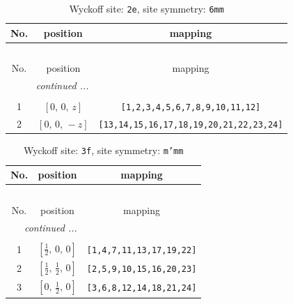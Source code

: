 \documentclass[fleqn,8pt]{jsarticle}
\begin{document}
\begin{longtable}{ccc}
\caption{Wyckoff site: {\tt 2e}, site symmetry: {\tt 6mm}}
 \\
 \hline \hline
No. & position & mapping \\ \hline \endfirsthead

\multicolumn{2}{l}{\tablename\ \thetable{}} \\
 \hline \hline
No. & position & mapping \\ \hline \endhead

 \hline \hline
\multicolumn{2}{r}{\footnotesize\it continued ...} \\ \endfoot

 \hline \hline
\multicolumn{2}{r}{} \\ \endlastfoot

1 & $\left[ 0,\, 0,\, z \right]$ & {\tt [1,2,3,4,5,6,7,8,9,10,11,12]} \\ \hline
2 & $\left[ 0,\, 0,\, - z \right]$ & {\tt [13,14,15,16,17,18,19,20,21,22,23,24]} \\
\end{longtable}
\renewcommand{\arraystretch}{1.2}
\begin{longtable}{ccc}
\caption{Wyckoff site: {\tt 3f}, site symmetry: {\tt m'mm}}
 \\
 \hline \hline
No. & position & mapping \\ \hline \endfirsthead

\multicolumn{2}{l}{\tablename\ \thetable{}} \\
 \hline \hline
No. & position & mapping \\ \hline \endhead

 \hline \hline
\multicolumn{2}{r}{\footnotesize\it continued ...} \\ \endfoot

 \hline \hline
\multicolumn{2}{r}{} \\ \endlastfoot

1 & $\left[ \frac{1}{2},\, 0,\, 0 \right]$ & {\tt [1,4,7,11,13,17,19,22]} \\ \hline
2 & $\left[ \frac{1}{2},\, \frac{1}{2},\, 0 \right]$ & {\tt [2,5,9,10,15,16,20,23]} \\ \hline
3 & $\left[ 0,\, \frac{1}{2},\, 0 \right]$ & {\tt [3,6,8,12,14,18,21,24]} \\
\end{longtable}
\renewcommand{\arraystretch}{1.2}
\end{document}
